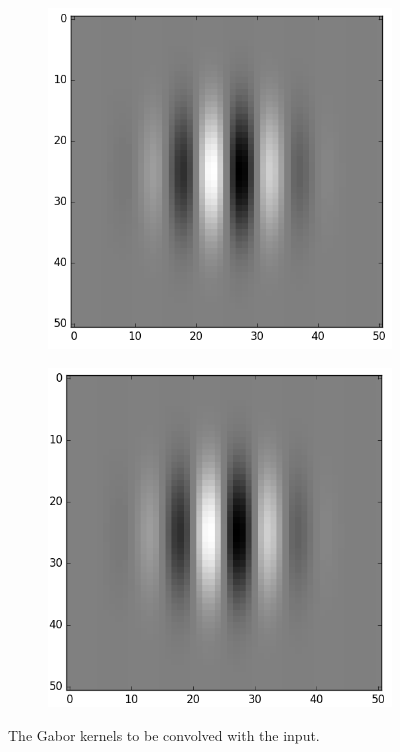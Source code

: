 \documentclass[]{article}
\begin{document}
\begin{figure}
  \centering
    \begin{subfigure}[t]{0.49\textwidth}
      \centering
      \includegraphics[width=0.99\linewidth]{gabor_kernel.png}
    \end{subfigure}
    \begin{subfigure}[t]{0.49\textwidth}
      \centering
      \includegraphics[width=0.99\linewidth]{gabor_kernel2.png}
    \end{subfigure}
    \caption{The Gabor kernels to be convolved with the input.}
    \label{fig:gabor-kernel}
\end{figure}
\end{document}
